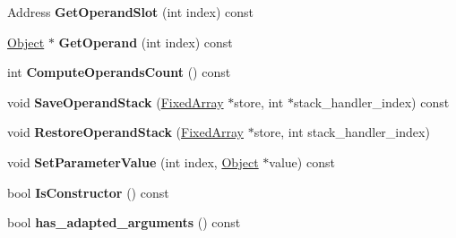 \begin{DoxyCompactItemize}
\item 
\hypertarget{classv8_1_1internal_1_1_java_script_frame_a6524f256e7b77e251fb9bdf7c41cde80}{}Address {\bfseries Get\+Operand\+Slot} (int index) const \label{classv8_1_1internal_1_1_java_script_frame_a6524f256e7b77e251fb9bdf7c41cde80}

\item 
\hypertarget{classv8_1_1internal_1_1_java_script_frame_a2db824fc67b2d16b9a7260da501ea70b}{}\hyperlink{classv8_1_1internal_1_1_object}{Object} $\ast$ {\bfseries Get\+Operand} (int index) const \label{classv8_1_1internal_1_1_java_script_frame_a2db824fc67b2d16b9a7260da501ea70b}

\item 
\hypertarget{classv8_1_1internal_1_1_java_script_frame_a17f85bd3f3a350f30e2443ea42005199}{}int {\bfseries Compute\+Operands\+Count} () const \label{classv8_1_1internal_1_1_java_script_frame_a17f85bd3f3a350f30e2443ea42005199}

\item 
\hypertarget{classv8_1_1internal_1_1_java_script_frame_a3b4a95e5684ca3833f5a9b8f421684ef}{}void {\bfseries Save\+Operand\+Stack} (\hyperlink{classv8_1_1internal_1_1_fixed_array}{Fixed\+Array} $\ast$store, int $\ast$stack\+\_\+handler\+\_\+index) const \label{classv8_1_1internal_1_1_java_script_frame_a3b4a95e5684ca3833f5a9b8f421684ef}

\item 
\hypertarget{classv8_1_1internal_1_1_java_script_frame_a282e1fe8c9fb13e33484d86178290d52}{}void {\bfseries Restore\+Operand\+Stack} (\hyperlink{classv8_1_1internal_1_1_fixed_array}{Fixed\+Array} $\ast$store, int stack\+\_\+handler\+\_\+index)\label{classv8_1_1internal_1_1_java_script_frame_a282e1fe8c9fb13e33484d86178290d52}

\item 
\hypertarget{classv8_1_1internal_1_1_java_script_frame_ab39bccf2a84f1d72e46218e11d72dd04}{}void {\bfseries Set\+Parameter\+Value} (int index, \hyperlink{classv8_1_1internal_1_1_object}{Object} $\ast$value) const \label{classv8_1_1internal_1_1_java_script_frame_ab39bccf2a84f1d72e46218e11d72dd04}

\item 
\hypertarget{classv8_1_1internal_1_1_java_script_frame_a3bc9903b5f071db8eb37aea2071ddb72}{}bool {\bfseries Is\+Constructor} () const \label{classv8_1_1internal_1_1_java_script_frame_a3bc9903b5f071db8eb37aea2071ddb72}

\item 
\hypertarget{classv8_1_1internal_1_1_java_script_frame_a6a793a5d5619ba1491fbf26f943dc5ad}{}bool {\bfseries has\+\_\+adapted\+\_\+arguments} () const \label{classv8_1_1internal_1_1_java_script_frame_a6a793a5d5619ba1491fbf26f943dc5ad}


\end{DoxyCompactItemize}
